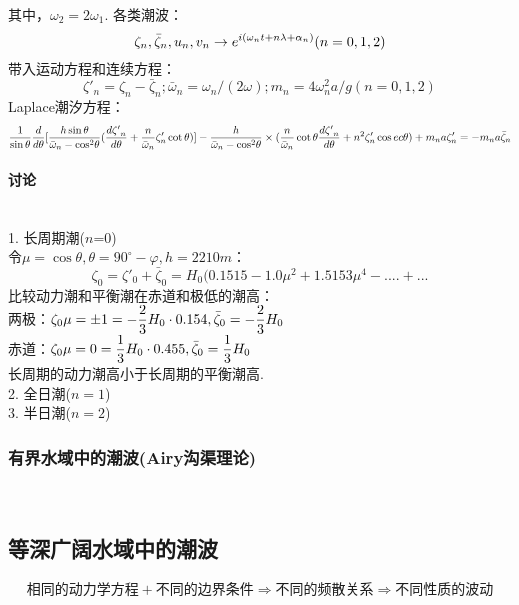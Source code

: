 \documentclass[a4paper,12pt]{article}
\begin{document}
    其中，${\omega _2} = 2{\omega _1}$.
    各类潮波：
    \[
        {\zeta _n},{\bar \zeta _n},{u_n},{v_n} \to {e^{i({\omega _n}t + n\lambda  + {\alpha _n})}}{\rm{  }}(n = 0,1,2)
    \]
    带入运动方程和连续方程：
    \[
        {\zeta '_n} = {\zeta _n} - {\bar \zeta _n};  {\bar \omega _n} = {\omega _n}/(2\omega );  {m_n} = 4\omega _n^2a/g  (n = 0,1,2)
    \]
    Laplace潮汐方程：
    \[
        {1 \over {\sin \theta }}{d \over {d\theta }}[{{h\sin \theta } \over {{{\bar \omega }_n} - {{\cos }^2}\theta }}({{d{{\zeta '}_n}} \over {d\theta }} + {n \over {{{\bar \omega }_n}}}{\zeta '_n}\cot \theta )] - {h \over {{{\bar \omega }_n} - {{\cos }^2}\theta }} \times ({n \over {{{\bar \omega }_n}}}\cot \theta {{d{{\zeta '}_n}} \over {d\theta }} + {n^2}{\zeta '_n}\cos ec\theta ) + {m_n}a{\zeta '_n} =  - {m_n}a{\bar \zeta _n}
    \]
    \paragraph{讨论}~{}\\
    1. 长周期潮($n$=0)\\
    令$\mu=\cos\theta,\theta=90^\circ-\varphi,h=2210m$：
    \[
        {\zeta _0} = {\zeta '_0} + {\bar \zeta _0} = {H_0}(0.1515 - 1.0{\mu ^2} + 1.5153{\mu ^4} - .... + ...
    \]
    比较动力潮和平衡潮在赤道和极低的潮高：\\
    两极：$\displaystyle {\zeta _0}\mu  =  \pm 1 =  - {2 \over 3}{H_0} \cdot 0.154,\bar{\zeta}_0=-{2 \over 3}H_0$\\
    赤道：$\displaystyle {\zeta _0}\mu  = 0 = {1 \over 3}{H_0} \cdot 0.455,\bar{\zeta}_0={1 \over 3}H_0$\\
    长周期的动力潮高小于长周期的平衡潮高.\\
    2. 全日潮($n=1$)\\
    3. 半日潮($n=2$)
    \subsubsection{有界水域中的潮波(Airy沟渠理论)}~{}
    \subsection{等深广阔水域中的潮波}
    \[
        \boxed{\mbox{相同的动力学方程}}+\boxed{\mbox{不同的边界条件}}\Rightarrow \boxed{\mbox{不同的频散关系}}\Rightarrow \boxed{\mbox{不同性质的波动}}
    \]
\end{document}

